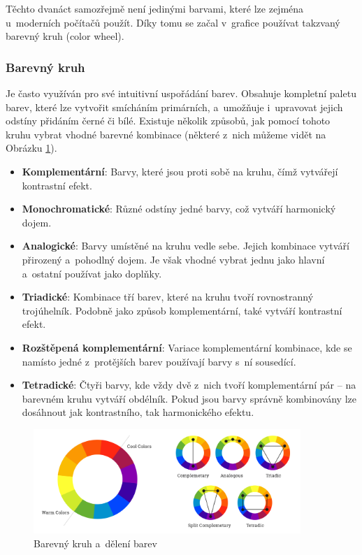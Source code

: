 Těchto dvanáct samozřejmě není jedinými barvami, které lze zejména u~moderních počítačů použít. Díky tomu se začal v~grafice používat takzvaný barevný kruh (color wheel). \cite{color_theory_design}

\subsubsection*{Barevný kruh}
Je často využíván pro své intuitivní uspořádání barev. Obsahuje kompletní paletu barev, které lze vytvořit smícháním primárních, a~umožňuje i~upravovat jejich odstíny přidáním černé či bílé. Existuje několik způsobů, jak pomocí tohoto kruhu vybrat vhodné barevné kombinace (některé z~nich můžeme vidět na Obrázku \ref{fig:color_theory}). \cite{color_wheel,color_schemes}
\begin{itemize}
    \item \textbf{Komplementární}: Barvy, které jsou proti sobě na kruhu, čímž vytvářejí kontrastní efekt.
    \item \textbf{Monochromatické}: Různé odstíny jedné barvy, což vytváří harmonický dojem.
    \item \textbf{Analogické}: Barvy umístěné na kruhu vedle sebe. Jejich kombinace vytváří přirozený a~pohodlný dojem. Je však vhodné vybrat jednu jako hlavní a~ostatní používat jako doplňky.
    \item \textbf{Triadické}: Kombinace tří barev, které na kruhu tvoří rovnostranný trojúhelník. Podobně jako způsob komplementární, také vytváří kontrastní efekt.
    \item \textbf{Rozštěpená komplementární}: Variace komplementární kombinace, kde se namísto jedné z~protějších barev používají barvy s~ní sousedící.
    \item \textbf{Tetradické}: Čtyři barvy, kde vždy dvě z~nich tvoří komplementární pár -- na barevném kruhu vytváří obdélník. Pokud jsou barvy správně kombinovány lze dosáhnout jak kontrastního, tak harmonického efektu.
\end{itemize}

\begin{figure}[H]
    \centering
    \includegraphics[width=0.9\textwidth]{resources/figures/color_theory.png}
    \caption{Barevný kruh a~dělení barev \cite{color_schemes}}
    \label{fig:color_theory}
\end{figure}

